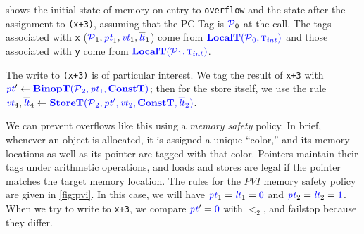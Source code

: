 \documentclass{llncs}
\begin{document}


 shows the initial state of memory on entry to {\tt overflow} and the state after
the assignment to {\tt *(x+3)}, assuming that the PC Tag is \(\PCT_0\) at the call. The tags associated
with {\tt x} (\(\PCT_1,\pt_1,\vt_1,\lts_1\)) come from \(\localtname(\PCT_0,\TN[int])\) and those
associated with {\tt y} come from \(\localtname(\PCT_1,\TN[int])\).

The write to {\tt *(x+3)} is of particular interest. We tag the result of {\tt x+3}
with \(\pt' \leftarrow \binoptname(\PCT_2, \pt_1, \constt)\); then for the store itself,
we use the rule \(\vt_4, \lts_4 \leftarrow \storetname(\PCT_2, \pt', \vt_2, \constt, \lts_2)\).

We can prevent overflows like this using a {\em memory safety} policy. In brief, whenever
an object is allocated, it is assigned a unique ``color,'' and its memory locations as well
as its pointer are tagged with that color. Pointers maintain their tags under arithmetic
operations, and loads and stores are legal if the pointer matches the target memory location.
The rules for the \(PVI\) memory safety policy are given in \cref{fig:pvi}. In this case, we will
have \(\pt_1 = \lt_1 = \tagz\) and \(\pt_2 = \lt_2 = \tagone\). When we try to write to {\tt x+3},
we compare \(\pt' = \tagz\) with \(\lt_2\), and failstop because they differ.
\end{document}
